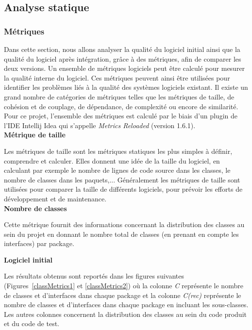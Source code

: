 \documentclass[12pt, openany]{report}
\begin{document}
\subsection{Analyse statique}

\subsubsection{Métriques}

Dans cette section, nous allons analyser la qualité du logiciel initial ainsi que la qualité du logiciel après intégration, grâce à des métriques, afin de comparer les deux versions. Un ensemble de métriques logiciels peut être calculé pour mesurer la qualité interne du logiciel. Ces métriques peuvent ainsi être utilisées pour identifier les problèmes liés à la qualité des systèmes logiciels existant. Il existe un grand nombre de catégories de métriques telles que les métriques de taille, de cohésion et de couplage, de dépendance, de complexité ou encore de similarité. Pour ce projet, l'ensemble des métriques est calculé par le biais d'un plugin de l'IDE Intellij Idea qui s'appelle \textit{Metrics Reloaded} (version 1.6.1).\\

\textbf{\large{Métrique de taille}}

Les métriques de taille sont les métriques statiques les plus simples à définir, comprendre et calculer. Elles donnent une idée de la taille du logiciel, en calculant par exemple le nombre de lignes de code source dans les classes, le nombre de classes dans les paquets,... Généralement les
métriques de taille sont utilisées pour comparer la taille de différents logiciels, pour prévoir les efforts de développement et de maintenance.\\

\textbf{Nombre de classes}

Cette métrique fournit des informations concernant la distribution des classes au sein du projet en donnant le nombre total de classes (en prenant en compte les interfaces) par package. 

\textbf{Logiciel initial}

Les résultats obtenus sont reportés dans les figures suivantes (Figures~\ref{classMetrics1} et \ref{classMetrics2}) où la colonne \textit{C} représente le nombre de classes et d'interfaces dans chaque package et la colonne \textit{C(rec)} représente le nombre de classes et d'interfaces dans chaque package en incluant les sous-classes. Les autres colonnes concernent la distribution des classes au sein du code produit et du code de test.
\end{document}
